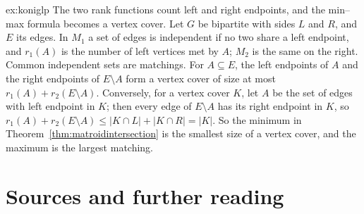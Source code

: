 \begin{solution}{ex:koniglp}
\idea The two rank functions count left and right endpoints, and the min--max formula becomes a vertex cover.
\writeup Let $G$ be bipartite with sides $L$ and $R$, and $E$ its edges. In $M_1$ a set of edges is independent if no two share a left endpoint, and $r_1(A)$ is the number of left vertices met by $A$; $M_2$ is the same on the right. Common independent sets
are matchings. For $A\subseteq E$, the left endpoints of $A$ and the right endpoints of $E\setminus A$ form a vertex cover of size at most $r_1(A)+r_2(E\setminus A)$. Conversely, for a vertex cover $K$, let $A$ be the set of edges with left endpoint in $K$; then every
edge of $E\setminus A$ has its right endpoint in $K$, so $r_1(A)+r_2(E\setminus A)\le|K\cap L|+|K\cap R|=|K|$. So the minimum in Theorem~\ref{thm:matroidintersection} is the smallest size of a vertex cover, and the maximum is the largest matching.
\end{solution}

\section*{Sources and further reading}

